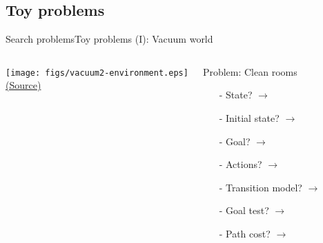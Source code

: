 \documentclass[10pt,compress]{beamer} %
\begin{document}
\subsection{Toy problems}
\begin{frame}[fragile]{Search problems}{Toy problems (I): Vacuum world}
       \begin{columns}
	            \centering 
                 \texttt{[image: figs/vacuum2-environment.eps]}\\
	            \tiny{\href{http://aima.cs.berkeley.edu/index.html}{(Source)}}

                \begin{exampleblock}{Problem: Clean rooms}
                    \begin{itemize}
                    \item[-] State? $\rightarrow$ 
                    \item[-] Initial state? $\rightarrow$ 
                    \item[-] Goal? $\rightarrow$ 
                    \item[-] Actions? $\rightarrow$ 
                    \item[-] Transition model? $\rightarrow$ 
                    \item[-] Goal test? $\rightarrow$ 
                    \item[-] Path cost? $\rightarrow$
                    \end{itemize}
                \end{exampleblock}
      \end{columns}
\end{frame}
\end{document}
